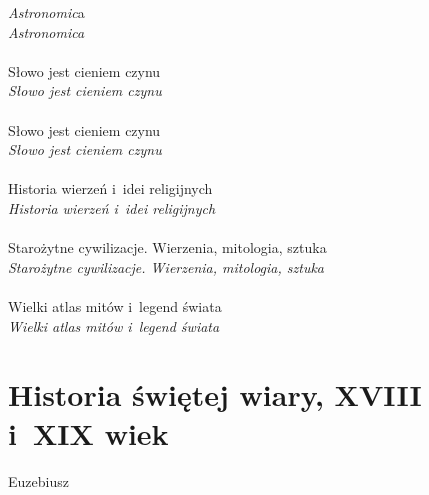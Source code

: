 \documentclass[a4paper,11pt]{article}
\begin{document}
\Jest  \emph{Astronomic}a \\
\Powin \emph{Astronomica} \\
 \\
\Jest  Słowo jest cieniem czynu \\
\Powin \emph{Słowo jest cieniem czynu} \\
 \\
\Jest  Słowo jest cieniem czynu \\
\Powin \emph{Słowo jest cieniem czynu} \\
 \\
\Jest  Historia wierzeń i~idei religijnych \\
\Powin \emph{Historia wierzeń i~idei religijnych} \\
 \\
\Jest  Starożytne cywilizacje. Wierzenia, mitologia, sztuka \\
\Powin \emph{Starożytne cywilizacje. Wierzenia, mitologia, sztuka} \\
 \\
\Jest  Wielki atlas mitów i~legend świata \\
\Powin \emph{Wielki atlas mitów i~legend świata} \\


\vspace{\spaceTwo}










\section{Historia świętej wiary, XVIII i~XIX wiek}

\vspace{\spaceTwo}






\start {} Euzebiusz \\


\end{document}
